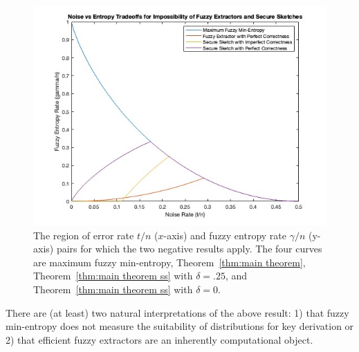 \begin{figure}[t]
\centering
\includegraphics[width=.8\textwidth]{EntropyvsError.jpg}
\caption{The region of error rate $t/n$ ($x$-axis) and fuzzy entropy rate $\gamma/n$ (y-axis) pairs for which the two negative results apply.  The four curves are maximum fuzzy min-entropy, Theorem~\ref{thm:main theorem}, Theorem~\ref{thm:main theorem ss} with $\delta=.25$, and Theorem~\ref{thm:main theorem ss} with $\delta =0$.}
\label{fig:param regime}
\end{figure}

There are (at least) two natural interpretations of the above result: 1) that fuzzy min-entropy does not measure the suitability of distributions for key derivation or 2) that efficient fuzzy extractors are an inherently computational object.

